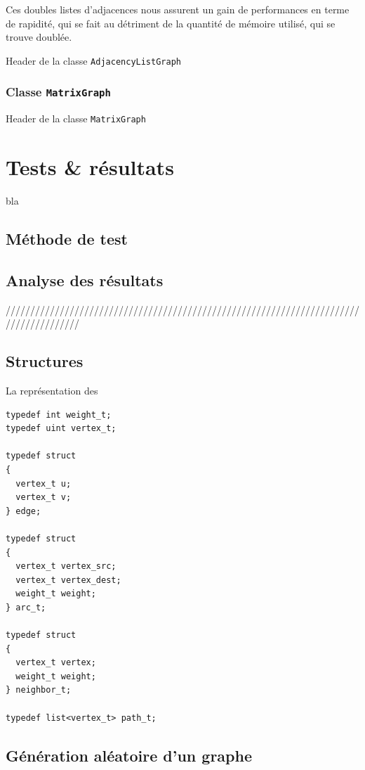 Ces doubles listes d'adjacences nous assurent un gain de performances en terme de rapidité, qui se fait au détriment de la quantité de mémoire utilisé, qui se trouve doublée.

Header de la classe \texttt{AdjacencyListGraph}




\subsubsection{Classe \texttt{MatrixGraph}}

Header de la classe \texttt{MatrixGraph}




\section{Tests \& résultats}
bla
\subsection{Méthode de test}

\subsection{Analyse des résultats}

///////////////////////////////////////////////////////////////////////////////////////

\subsection{Structures}

La représentation des 

\begin{verbatim}
typedef int weight_t;
typedef uint vertex_t;

typedef struct
{
  vertex_t u;
  vertex_t v;
} edge;

typedef struct
{
  vertex_t vertex_src;
  vertex_t vertex_dest;
  weight_t weight;
} arc_t;

typedef struct
{
  vertex_t vertex;
  weight_t weight;
} neighbor_t;
  
typedef list<vertex_t> path_t;

\end{verbatim}


\subsection{Génération aléatoire d'un graphe}

